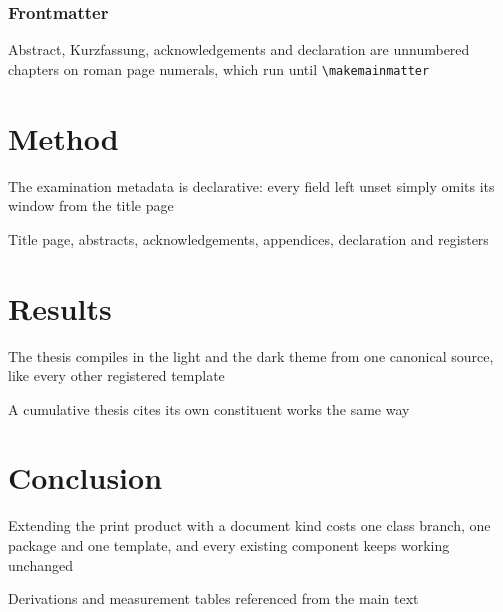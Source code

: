 \subsection{Frontmatter}
Abstract, Kurzfassung, acknowledgements and declaration are unnumbered chapters on roman page numerals, which run until \texttt{\textbackslash makemainmatter}

\chapter{Method}
The examination metadata is declarative: every field left unset simply omits its window from the title page \cite{expl32024}

\begin{Figure}[title=Apparatus, height=3cm, anchor=center, justify=center]
  Title page, abstracts, acknowledgements, appendices, declaration and registers
\end{Figure}

\chapter{Results}
\begin{Blockquote}
  The thesis compiles in the light and the dark theme from one canonical source, like every other registered template
\end{Blockquote}
A cumulative thesis cites its own constituent works the same way \cite{dissertation2026}

\chapter{Conclusion}
Extending the print product with a document kind costs one class branch, one package and one template, and every existing component keeps working unchanged

\makeappendices
{}
Derivations and measurement tables referenced from the main text

\makeregisters


